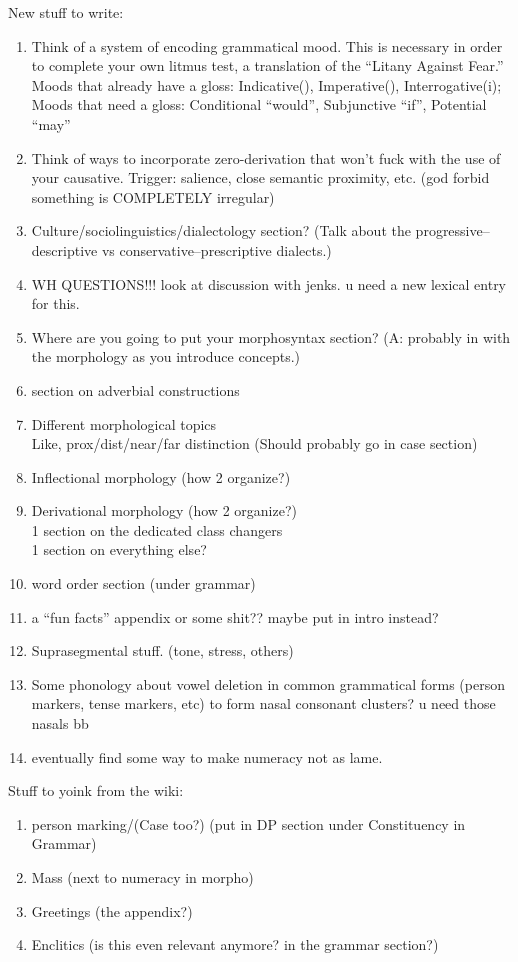 New stuff to write:
	\begin{enumerate}
		\item Think of a system of encoding grammatical mood. This is necessary in order to complete your own litmus test, a translation of the ``Litany Against Fear.'' Moods that already have a gloss: Indicative(\0), Imperative(\R\OO), Interrogative(\R i); Moods that need a gloss: Conditional ``would'', Subjunctive ``if'', Potential ``may''
		\item Think of ways to incorporate zero-derivation that won't fuck with the use of your causative. Trigger: salience, close semantic proximity, etc. (god forbid something is COMPLETELY irregular)
		\item Culture/sociolinguistics/dialectology section? (Talk about the progressive--descriptive vs conservative--prescriptive dialects.)
		\item WH QUESTIONS!!! look at discussion with jenks. u need a new lexical entry for this.
		\item Where are you going to put your morphosyntax section? (A: probably in with the morphology as you introduce concepts.)
		\item section on adverbial constructions
		\item Different morphological topics
		\\ Like, prox/dist/near/far distinction (Should probably go in case section)
		\item Inflectional morphology (how 2 organize?)
		\item Derivational morphology (how 2 organize?)
		\\ 1 section on the dedicated class changers
		\\ 1 section on everything else? %
		\item word order section (under grammar)
		\item a ``fun facts'' appendix or some shit?? maybe put in intro instead?
		\item Suprasegmental stuff. (tone, stress, others)
		\item Some phonology about vowel deletion in common grammatical forms (person markers, tense markers, etc) to form nasal consonant clusters? u need those nasals bb
		\item eventually find some way to make numeracy not as lame.
	\end{enumerate}

Stuff to yoink from the wiki:
	\begin{enumerate}
		\item person marking/(Case too?) (put in DP section under Constituency in Grammar)
		\item Mass (next to numeracy in morpho) %
		\item Greetings (the appendix?)
		\item Enclitics (is this even relevant anymore? in the grammar section?)
	\end{enumerate}

\clearpage